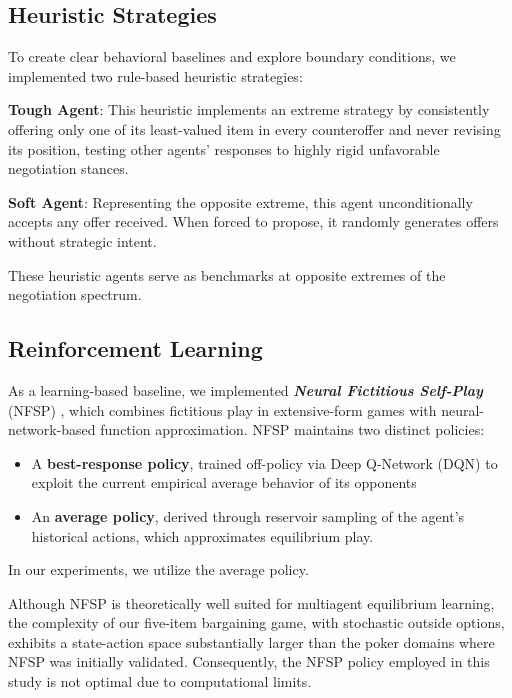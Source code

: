 \documentclass{article}
\theoremstyle{plain}
\theoremstyle{definition}
\theoremstyle{remark}
\newcommand{\term}[1]{\textbf{\textit{#1}}}
\begin{document}
\subsection{Heuristic Strategies}
To create clear behavioral baselines and explore boundary conditions, we implemented two rule-based heuristic strategies:

\textbf{Tough Agent}: This heuristic implements an extreme strategy by consistently offering only one of its least-valued item in every counteroffer and never revising its position, testing other agents' responses to highly rigid unfavorable negotiation stances.

\textbf{Soft Agent}: Representing the opposite extreme, this agent unconditionally accepts any offer received. 
When forced to propose, it randomly generates offers without strategic intent.

These heuristic agents serve as benchmarks at opposite extremes of the negotiation spectrum.

\subsection{Reinforcement Learning}

As a learning-based baseline, we implemented \term{Neural Fictitious Self-Play} (NFSP) \citep{heinrich2016deep}, which combines fictitious play in extensive-form games \citep{heinrich2015fictitious} with neural-network-based function approximation.
NFSP maintains two distinct policies:
\begin{itemize}
  \item A \textbf{best-response policy}, trained off-policy via Deep Q-Network (DQN) \citep{mnih2013playing} to exploit the current empirical average behavior of its opponents
  \item An \textbf{average policy}, derived through reservoir sampling \citep{vitter1985random} of the agent’s historical actions, which approximates equilibrium play.
\end{itemize}
In our experiments, we utilize the average policy.

Although NFSP is theoretically well suited for multiagent equilibrium learning, the complexity of our five-item bargaining game, with stochastic outside options, exhibits a state-action space substantially larger than the poker domains where NFSP was initially validated. 
Consequently, the NFSP policy employed in this study is not optimal due to computational limits.
\end{document}
